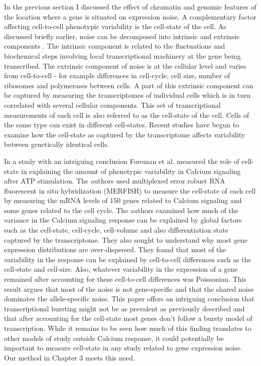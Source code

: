 In the previous section I discussed the effect of chromatin and genomic features of the location where a gene is situated on expression noise. A complementary factor affecting cell-to-cell phenotypic variability is the cell-state of the cell. As discussed briefly earlier, noise can be decomposed into intrinsic and extrinsic components \cite{swain2002pnas} \cite{raser_noise_2005}. The intrinsic component is related to the fluctuations and biochemical steps involving local transcriptional machinery at the gene being transcribed. The extrinsic component of noise is at the cellular level and varies from cell-to-cell - for example differences in cell-cycle, cell size, number of ribosomes and polymerases between cells. A part of this extrinsic component can be captured by measuring the transcriptomes of individual cells \cite{macosko2015c} which is in turn correlated with several cellular components. This set of transcriptional measurements of each cell is also referred to as the cell-state of the cell. Cells of the same type can exist in different cell-states. Recent studies have begun to examine how the cell-state as captured by the transcriptome affects variability between genetically identical cells.

In a study with an intriguing conclusion Foreman et al. \cite{foreman_mammalian_2019} measured the role of cell-state in explaining the amount of phenotypic variability in Calcium signaling after ATP stimulation. The authors used multiplexed error robust RNA fluorescent in situ hybridization (MERFISH) to measure the cell-state of each cell by measuring the mRNA levels of 150 genes related to Calcium signaling and some genes related to the cell cycle. The authors examined how much of the variance in the Calcium signaling response can be explained by global factors such as the cell-state, cell-cycle, cell-volume and also differentiation state captured by the transcriptome. They also sought to understand why most gene expression distributions are over-dispersed. They found that most of the variability in the response can be explained by cell-to-cell differences such as the cell-state and cell-size. Also, whatever variability in the expression of a gene remained after accounting for these cell-to-cell differences was Poissonian. This result argues that most of the noise is not gene-specific and that the shared noise dominates the allele-specific noise. This paper offers an intriguing conclusion that transcriptional bursting might not be as prevalent as previously described and that after accounting for the cell-state most genes don't follow a bursty model of transcription. While it remains to be seen how much of this finding translates to other models of study outside Calcium response, it could potentially be important to measure cell-state in any study related to gene expression noise. Our method in Chapter 3 meets this need.

